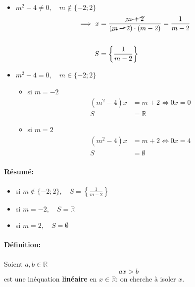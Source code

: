 \documentclass[
    11pt,
    a4paper,
    oneside,
    headinlcude, footinclude,
    twoside,
]{report}
\begin{document}
\begin{itemize}
    \item $m^{2} - 4 \neq 0, \quad m \notin \{-2; 2\}$
        \[
            \begin{split}
            \implies x &= \frac{\cancel{m+2}}{(\cancel{m+2})\cdot(m-2)} = \frac{1}{m-2}\\
            \\
            S &= \left\{\frac{1}{m-2}\right\}
            \end{split}
        \]

    \item $m^{2} - 4 = 0, \quad m \in \{-2; 2\}$ 

        \begin{itemize}
            \item si $m = -2$
                \[
                    \begin{split}
                        (m^{2} - 4)x &= m + 2  \iff 0x = 0\\
                        S &= \mathbb{R}
                    \end{split}
                \]
            \item si $m = 2$
                \[
                    \begin{split}
                        (m^{2} - 4)x &= m + 2  \iff 0x = 4\\
                        S &= \emptyset
                    \end{split}
                \]
        \end{itemize}
\end{itemize}

\paragraph{Résumé:}

\begin{itemize}
    \item si $m \notin \{-2; 2\}, \quad S = \left\{\frac{1}{m-2}\right\}$
    \item si $m = -2  , \quad S = \mathbb{R}$
    \item si $m = 2 , \quad S = \emptyset$
\end{itemize}

\paragraph{Définition:}

Soient $a, b \in \mathbb{R}$
$$ax > b$$
est une inéquation \textbf{linéaire} en $x \in \mathbb{R}$: on cherche à
isoler $x$.
\end{document}
